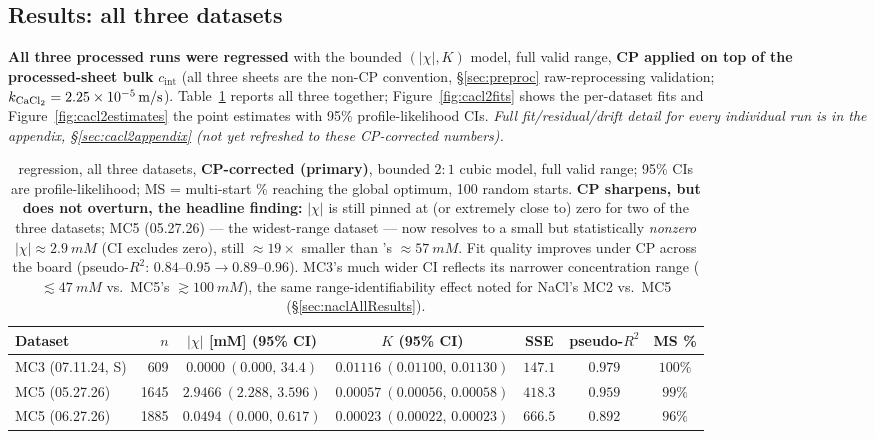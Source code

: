 \documentclass[11pt]{article}
\newcommand{\cint}{c_{\mathrm{int}}}
\begin{document}
\subsection{Results: all three datasets}\label{sec:cacl2results}
\textbf{All three processed  runs were regressed} with the bounded
$(|\chi|,K)$ model, full valid range, \textbf{CP applied on top of the
processed-sheet
bulk} $\cint$ (all three sheets are the non-CP convention, \S\ref{sec:preproc}
raw-reprocessing validation; $k_{\ce{CaCl2}}=\SI{2.25e-5}{m/s}$). Table~\ref{tab:cacl2all}
reports all three together; Figure~\ref{fig:cacl2fits} shows the per-dataset
fits and Figure~\ref{fig:cacl2estimates} the point estimates with 95\%
profile-likelihood CIs. \emph{Full fit/residual/drift detail for every
individual run is in the appendix, \S\ref{sec:cacl2appendix} (not yet refreshed
to these CP-corrected numbers).}

\begin{table}[H]
\centering\small\setlength{\tabcolsep}{4pt}
\begin{tabular}{lrccccc}
\toprule
Dataset & $n$ & $|\chi|$ [\si{mM}] (95\% CI) & $K$ (95\% CI) & SSE & pseudo-$R^2$ & MS \% \\
\midrule
MC3 (07.11.24, S) & 609  & $0.0000\ (0.000,\,34.4)$  & $0.01116\ (0.01100,\,0.01130)$ & $147.1$  & $0.979$ & $100\%$\\
MC5 (05.27.26)     & 1645 & $2.9466\ (2.288,\,3.596)$ & $0.00057\ (0.00056,\,0.00058)$ & $418.3$  & $0.959$ & $99\%$\\
MC5 (06.27.26)     & 1885 & $0.0494\ (0.000,\,0.617)$ & $0.00023\ (0.00022,\,0.00023)$ & $666.5$  & $0.892$ & $96\%$\\
\bottomrule
\end{tabular}
\caption{ regression, all three datasets, \textbf{CP-corrected
(primary)}, bounded $2{:}1$ cubic model, full valid range; 95\% CIs are
profile-likelihood; MS = multi-start \% reaching the global optimum, 100 random
starts. \textbf{CP sharpens, but does not overturn, the headline finding:}
$|\chi|$ is still pinned at (or extremely close to) zero for two of the three
datasets; MC5 (05.27.26) --- the widest-range dataset --- now resolves to a
small but statistically \emph{nonzero} $|\chi|\approx\SI{2.9}{mM}$ (CI excludes
zero), still $\approx19\times$ smaller than 's $\approx\SI{57}{mM}$. Fit
quality improves under CP across the board (pseudo-$R^2$: $0.84$--$0.95\to
0.89$--$0.96$). MC3's much wider CI
reflects its narrower concentration range ($\lesssim\SI{47}{mM}$ vs.\ MC5's
$\gtrsim\SI{100}{mM}$), the same range-identifiability effect noted for NaCl's
MC2 vs.\ MC5 (\S\ref{sec:naclAllResults}).}
\label{tab:cacl2all}
\end{table}
\end{document}
